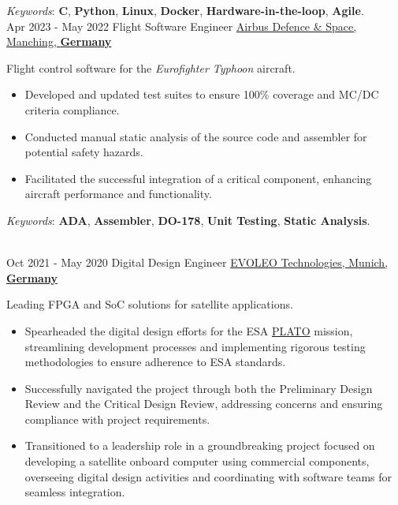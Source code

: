 \documentclass[letterpaper]{twentysecondcv} %
\begin{document}
\begin{twenty}
{            \vspace{1 mm}
            \textit{Keywords}: \textbf{C}, \textbf{Python}, \textbf{Linux}, \textbf{Docker}, \textbf{Hardware-in-the-loop}, \textbf{Agile}.
        }\\
    \twentyitem
        {Apr 2023 -}
        {May 2022}
        {Flight Software Engineer}
        {\href{https://www.airbus.com/en/who-we-are}{Airbus Defence \& Space, Manching, \textbf{Germany}}}
        {}
        {
            Flight control software for the \textit{Eurofighter Typhoon} aircraft.
            \vspace{1 mm}
            \begin{itemize}
                \item Developed and updated test suites to ensure 100\% coverage and MC/DC criteria compliance.
                \item Conducted manual static analysis of the source code and assembler for potential safety hazards.
                \item Facilitated the successful integration of a critical component, enhancing aircraft performance and functionality.
            \end{itemize}

            \vspace{1 mm}
            \textit{Keywords}: \textbf{ADA}, \textbf{Assembler}, \textbf{DO-178}, \textbf{Unit Testing}, \textbf{Static Analysis}.
        }\\
    \twentyitem
        {Oct 2021 -}
    	{May 2020}
        {Digital Design Engineer}
        {\href{http://evoleotech.com/company/}{EVOLEO Technologies, Munich, \textbf{Germany}}}
        {}
        {
            Leading FPGA and SoC solutions for satellite applications.
            \vspace{1 mm}
            \begin{itemize}
                \item Spearheaded the digital design efforts for the ESA \href{https://sci.esa.int/web/plato}{PLATO} mission, streamlining development processes and implementing rigorous testing methodologies to ensure adherence to ESA standards.
                \item Successfully navigated the project through both the Preliminary Design Review and the Critical Design Review, addressing concerns and ensuring compliance with project requirements.
                \item Transitioned to a leadership role in a groundbreaking project focused on developing a satellite onboard computer using commercial components, overseeing digital design activities and coordinating with software teams for seamless integration.
            \end{itemize}

}
\end{twenty}
\end{document}
